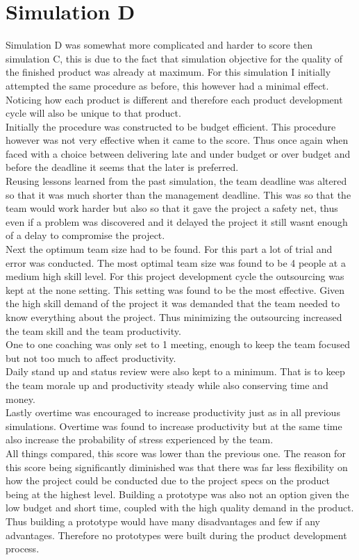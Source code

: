 \documentclass{article}
\begin{document}
\section{Simulation D}
Simulation D was somewhat more complicated and harder to score then simulation C, this is due to the fact that simulation objective for the quality of the finished product was already at maximum. 
For this simulation I initially attempted the same procedure as before, this however had a minimal effect. \\
Noticing how each product is different and therefore each product development cycle will also be unique to that product.\\
Initially the procedure was constructed to be budget efficient. This procedure however was not very effective when it came to the score. Thus once again when faced with a choice between delivering late and under budget or over budget and before the deadline it seems that the later is preferred. \\
Reusing lessons learned from the past simulation,  the team deadline was altered so that it was much shorter than the management deadline. This was so that the team would work harder but also so that it gave the project a safety net, thus even if a problem was discovered and it delayed the project it still wasnt enough of a delay to compromise the project.\\
Next the optimum team size had to be found. For this part a lot of trial and error was conducted. The most optimal team size was found to be 4 people at a medium high skill level.
For this project development cycle the outsourcing was kept at the none setting. This setting was found to be the most effective. Given the high skill demand of the project it was demanded that the team needed to know everything about the project. Thus minimizing the outsourcing increased the team skill and the team productivity.\\
One to one coaching was only set to 1 meeting, enough to keep the team focused but not too much to affect productivity.\\
Daily stand up and status review were also kept to a minimum. That is to keep the team morale up and productivity steady while also conserving time and money.\\
Lastly overtime was encouraged to increase productivity just as in all previous simulations. Overtime was found to increase productivity but at the same time also increase the probability of stress experienced by the team.\\
All things compared, this score was lower than the previous one. The reason for this score being significantly diminished was that there was far less flexibility on how the project could be conducted due to the project specs on the product being at the highest level. Building  a prototype was also not an option given the low budget and short time, coupled with the high quality demand in the product. Thus building a prototype would have many disadvantages and few if any advantages. Therefore no prototypes were built during the product development process.
\end{document}
